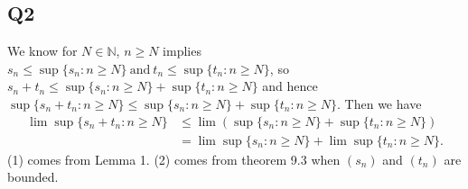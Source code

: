 \documentclass[12pt,lettersize]{article}
\newcommand{\N}{\mathbb{N}}
\theoremstyle{remark}
\begin{document}
	\subsection*{Q2}
	We know for $N\in\N$, $n\geq N$ implies $s_n\leq\sup\{s_n: n\geq N\}\ \text{and}\ t_n\leq\sup\{t_n: n\geq N\}$, so
	$s_n+t_n\leq\sup\{s_n: n\geq N\}+\sup\{t_n: n\geq N\}$ and hence $\sup\{s_n+t_n: n\geq N\}\leq\sup\{s_n: n\geq N\}+\sup\{t_n: n\geq N\}$. Then we have
	\begin{align}
		\lim\sup\{s_n+t_n: n\geq N\} &\leq\lim(\sup\{s_n: n\geq N\}+\sup\{t_n: n\geq N\})\\
									 &= \lim\sup\{s_n: n\geq N\}+\lim\sup\{t_n: n\geq N\}.
	\end{align}
	(1) comes from Lemma 1. (2) comes from theorem 9.3 when $(s_n)$ and $(t_n)$ are bounded.
	\newpage
	
\end{document}
